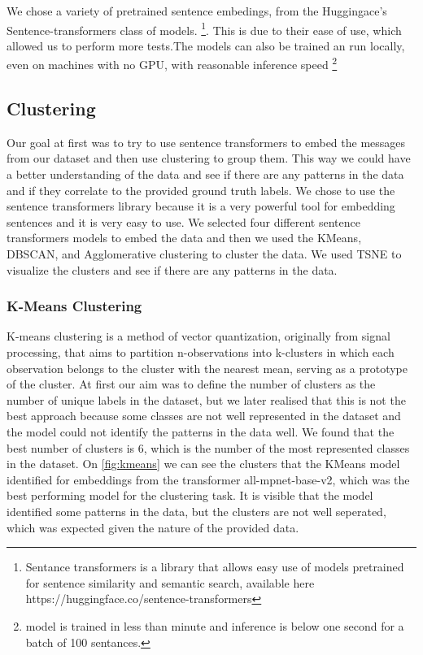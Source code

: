 \documentclass[fleqn,moreauthors,10pt]{ds_report}
\begin{document}
We chose a variety of pretrained sentence embedings, from the Huggingace's Sentence-transformers class of models.
\footnote{Sentance transformers is a library that allows easy use of models pretrained for sentence similarity and semantic search, available here https://huggingface.co/sentence-transformers}.
This is due to their ease of use, which allowed us to perform more tests.The models can also be trained an run locally, even on machines with no GPU, with reasonable inference speed \footnote{model is trained in less than  minute and inference is below one second for a batch of 100 sentances.}

\subsection{Clustering}
Our goal at first was to try to use sentence transformers to embed the messages from our dataset and then use clustering to group them.
This way we could have a better understanding of the data and see if there are any patterns in the data and if they correlate to the provided ground truth labels.
We chose to use the sentence transformers library because it is a very powerful tool for embedding sentences and it is very easy to use.
We selected four different sentence transformers models to embed the data and then we used the KMeans, DBSCAN, and Agglomerative clustering to cluster the data.
We used TSNE to visualize the clusters and see if there are any patterns in the data.

\subsubsection{K-Means Clustering}
K-means clustering is a method of vector quantization, originally from signal processing, that aims to partition n-observations into k-clusters in which each observation belongs to the cluster with the nearest mean, serving as a prototype of the cluster.
At first our aim was to define the number of clusters as the number of unique labels in the dataset, but we later realised that this is not the best approach because some classes are not well represented in the dataset and the model could not identify the patterns in the data well.
We found that the best number of clusters is 6, which is the number of the most represented classes in the dataset.
On \ref{fig:kmeans} we can see the clusters that the KMeans model identified for embeddings from the transformer all-mpnet-base-v2, 
which was the best performing model for the clustering task. It is visible that the model identified some patterns in the data, but the clusters are not well seperated, 
which was expected given the nature of the provided data.
\end{document}
